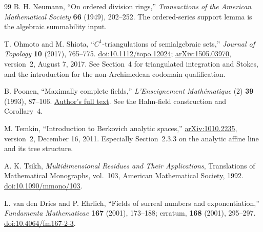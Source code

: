 \documentclass[11pt,letterpaper]{article}
\theoremstyle{definition}
\theoremstyle{remark}
\numberwithin{equation}{section}
\begin{document}
\begin{thebibliography}{99}
B. H. Neumann,
``On ordered division rings,''
\emph{Transactions of the American Mathematical Society} \textbf{66} (1949), 202--252.
The ordered-series support lemma is the algebraic summability input.

T. Ohmoto and M. Shiota,
``$C^1$-triangulations of semialgebraic sets,''
\emph{Journal of Topology} \textbf{10} (2017), 765--775.
\href{https://doi.org/10.1112/topo.12024}{doi:10.1112/topo.12024};
\href{https://arxiv.org/abs/1505.03970}{arXiv:1505.03970}, version~2, August 7, 2017.
See Section~4 for triangulated integration and Stokes, and the introduction for the non-Archimedean codomain qualification.

B. Poonen,
``Maximally complete fields,''
\emph{L'Enseignement Math\'ematique} (2) \textbf{39} (1993), 87--106.
\href{https://math.mit.edu/~poonen/papers/amsval.pdf}{Author's full text}.
See the Hahn-field construction and Corollary~4.

M. Temkin,
``Introduction to Berkovich analytic spaces,''
\href{https://arxiv.org/abs/1010.2235}{arXiv:1010.2235}, version~2, December 16, 2011.
Especially Section~2.3.3 on the analytic affine line and its tree structure.

A. K. Tsikh,
\emph{Multidimensional Residues and Their Applications},
Translations of Mathematical Monographs, vol.~103, American Mathematical Society, 1992.
\href{https://doi.org/10.1090/mmono/103}{doi:10.1090/mmono/103}.

L. van den Dries and P. Ehrlich,
``Fields of surreal numbers and exponentiation,''
\emph{Fundamenta Mathematicae} \textbf{167} (2001), 173--188;
erratum, \textbf{168} (2001), 295--297.
\href{https://doi.org/10.4064/fm167-2-3}{doi:10.4064/fm167-2-3}.

\end{thebibliography}
\end{document}
